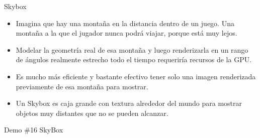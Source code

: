 \begin{frame}{Skybox}
\begin{itemize}
\item Imagina que hay una montaña en la distancia dentro de un juego. Una montaña a la que el jugador nunca podrá viajar, porque está muy lejos. 
\item Modelar la geometría real de esa montaña y luego renderizarla en un rango de ángulos realmente estrecho todo el tiempo requeriría recursos de la GPU. 
\item Es mucho más eficiente y bastante efectivo tener solo una imagen renderizada previamente de esa montaña para mostrar. 
\item Un Skybox es caja grande con textura alrededor del mundo para mostrar objetos muy distantes que no se pueden alcanzar.
\end{itemize}

\begin{block}{Demo \#16}
SkyBox
\end{block}
\end{frame}	


